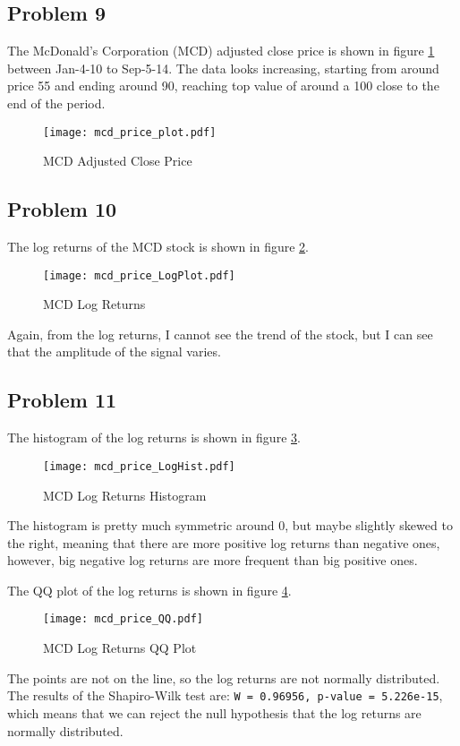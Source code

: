 \documentclass{article}
\begin{document}
\subsection{Problem 9}
The McDonald's Corporation (MCD) adjusted close price is shown in figure \ref{fig:mcd_price}
between Jan-4-10 to Sep-5-14. The data looks increasing,
starting from around price 55 and ending around 90,
reaching top value of around a 100 close to the end of the period.
\begin{figure}[ht]
    \centering
    \texttt{[image: mcd\_price\_plot.pdf]}
    \caption{MCD Adjusted Close Price}
    \label{fig:mcd_price}
\end{figure}
\subsection{Problem 10}
The log returns of the MCD stock is shown in figure \ref{fig:mcd_logret}.
\begin{figure}[ht]
    \centering
    \texttt{[image: mcd\_price\_LogPlot.pdf]}
    \caption{MCD Log Returns}
    \label{fig:mcd_logret}
\end{figure}
Again, from the log returns, I cannot see the trend of the stock,
but I can see that the amplitude of the signal varies.
\subsection{Problem 11}
The histogram of the log returns is shown in figure \ref{fig:mcd_hist}.
\begin{figure}[ht]
    \centering
    \texttt{[image: mcd\_price\_LogHist.pdf]}
    \caption{MCD Log Returns Histogram}
    \label{fig:mcd_hist}
\end{figure}
The histogram is pretty much symmetric around 0,
but maybe slightly skewed to the right,
meaning that there are more positive log returns than negative ones,
however, big negative log returns are more frequent than big positive ones.

The QQ plot of the log returns is shown in figure \ref{fig:mcd_qq}.
\begin{figure}[ht]
    \centering
    \texttt{[image: mcd\_price\_QQ.pdf]}
    \caption{MCD Log Returns QQ Plot}
    \label{fig:mcd_qq}
\end{figure}
The points are not on the line,
so the log returns are not normally distributed.
The results of the Shapiro-Wilk test are:
\texttt{W = 0.96956, p-value = 5.226e-15},
which means that we can reject the null hypothesis that the log returns are normally distributed.
\end{document}
